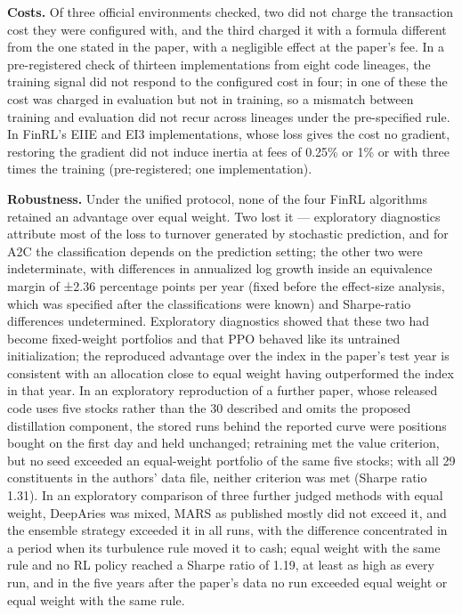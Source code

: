 \documentclass[12pt,a4paper]{report}
\newcounter{none} %
\begin{document}
\textbf{Costs.} Of three official environments checked, two did not
charge the transaction cost they were configured with, and the third
charged it with a formula different from the one stated in the paper,
with a negligible effect at the paper's fee. In a pre-registered check
of thirteen implementations from eight code lineages, the training
signal did not respond to the configured cost in four; in one of these
the cost was charged in evaluation but not in training, so a mismatch
between training and evaluation did not recur across lineages under the
pre-specified rule. In FinRL's EIIE and EI3 implementations, whose loss
gives the cost no gradient, restoring the gradient did not induce
inertia at fees of 0.25\% or 1\% or with three times the training
(pre-registered; one implementation).

\textbf{Robustness.} Under the unified protocol, none of the four FinRL
algorithms retained an advantage over equal weight. Two lost it ---
exploratory diagnostics attribute most of the loss to turnover generated
by stochastic prediction, and for A2C the classification depends on the
prediction setting; the other two were indeterminate, with differences
in annualized log growth inside an equivalence margin of ±2.36
percentage points per year (fixed before the effect-size analysis, which
was specified after the classifications were known) and Sharpe-ratio
differences undetermined. Exploratory diagnostics showed that these two
had become fixed-weight portfolios and that PPO behaved like its
untrained initialization; the reproduced advantage over the index in the
paper's test year is consistent with an allocation close to equal weight
having outperformed the index in that year. In an exploratory
reproduction of a further paper, whose released code uses five stocks
rather than the 30 described and omits the proposed distillation
component, the stored runs behind the reported curve were positions
bought on the first day and held unchanged; retraining met the value
criterion, but no seed exceeded an equal-weight portfolio of the same
five stocks; with all 29 constituents in the authors' data file, neither
criterion was met (Sharpe ratio 1.31). In an exploratory comparison of
three further judged methods with equal weight, DeepAries was mixed,
MARS as published mostly did not exceed it, and the ensemble strategy
exceeded it in all runs, with the difference concentrated in a period
when its turbulence rule moved it to cash; equal weight with the same
rule and no RL policy reached a Sharpe ratio of 1.19, at least as high
as every run, and in the five years after the paper's data no run
exceeded equal weight or equal weight with the same rule.
\end{document}
